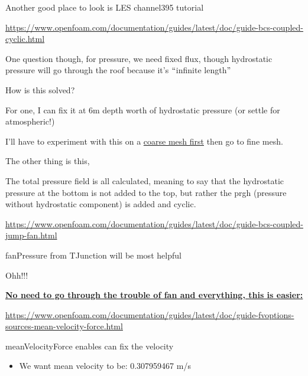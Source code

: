 \documentclass[12pt]{article}
\renewcommand{\_}{\kern-1.5pt\textunderscore\kern-1.5pt}
\begin{document}
Another good place to look is LES channel395 tutorial\par

\href{https://www.openfoam.com/documentation/guides/latest/doc/guide-bcs-coupled-cyclic.html}{https://www.openfoam.com/documentation/guides/latest/doc/guide-bcs-coupled-cyclic.html}\par


\vspace{\baselineskip}
One question though, for pressure, we need fixed flux, though hydrostatic pressure will go through the roof because it’s $``$infinite length$"$ \par

How is this solved?\par

For one, I can fix it at 6m depth worth of hydrostatic pressure (or settle for atmospheric!)\par

I’ll have to experiment with this on a \uline{coarse mesh first} then go to fine mesh.\par

The other thing is this, \par

The total pressure field is all calculated, meaning to say that the hydrostatic pressure at the bottom is not added to the top, but rather the p\_rgh (pressure without hydrostatic component) is added and cyclic.\par

\href{https://www.openfoam.com/documentation/guides/latest/doc/guide-bcs-coupled-jump-fan.html}{https://www.openfoam.com/documentation/guides/latest/doc/guide-bcs-coupled-jump-fan.html}\par

fanPressure from TJunction will be most helpful\par

Ohh!!!\par

\textbf{\uline{No need to go through the trouble of fan and everything, this is easier:}}\par

\href{https://www.openfoam.com/documentation/guides/latest/doc/guide-fvoptions-sources-mean-velocity-force.html}{https://www.openfoam.com/documentation/guides/latest/doc/guide-fvoptions-sources-mean-velocity-force.html}\par

meanVelocityForce enables can fix the velocity\par
\begin{itemize}
	\item We want mean velocity to be: 0.307959467 m/s\par

\end{itemize}
\end{document}
